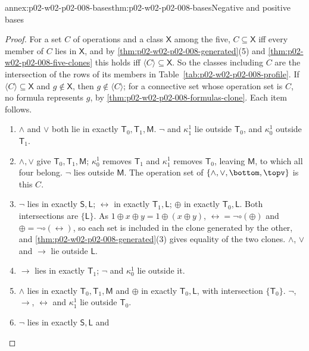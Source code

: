 \begin{annexitem}{annex:p02-w02-p02-008-bases}{thm:p02-w02-p02-008-bases}{Negative and positive bases}
\begin{proof}
For a set \(C\) of operations and a class \(\mathsf X\) among the five,
\(C\subseteq\mathsf X\) iff every member of \(C\) lies in \(\mathsf X\), and
by \cref{thm:p02-w02-p02-008-generated}(5) and
\cref{thm:p02-w02-p02-008-five-clones} this holds iff
\(\langle C\rangle\subseteq\mathsf X\).  So the classes including \(C\) are
the intersection of the rows of its members in
Table~\ref{tab:p02-w02-p02-008-profile}.  If \(\langle C\rangle\subseteq
\mathsf X\) and \(g\notin\mathsf X\), then \(g\notin\langle C\rangle\); for a
connective set whose operation set is \(C\), no formula represents \(g\), by
\cref{thm:p02-w02-p02-008-formulas-clone}.  Each item follows.
\begin{enumerate}
\item \(\land\) and \(\lor\) both lie in exactly
  \(\mathsf T_0,\mathsf T_1,\mathsf M\).  \(\neg\) and \(\kappa^1_1\) lie
  outside \(\mathsf T_0\), and \(\kappa^1_0\) outside \(\mathsf T_1\).
\item \(\land,\lor\) give \(\mathsf T_0,\mathsf T_1,\mathsf M\);
  \(\kappa^1_0\) removes \(\mathsf T_1\) and \(\kappa^1_1\) removes
  \(\mathsf T_0\), leaving \(\mathsf M\), to which all four belong.  \(\neg\)
  lies outside \(\mathsf M\).  The operation set of
  \(\{\land,\lor,\bottom,\topv\}\) is this \(C\).
\item \(\neg\) lies in exactly \(\mathsf S,\mathsf L\); \(\leftrightarrow\) in
  exactly \(\mathsf T_1,\mathsf L\); \(\oplus\) in exactly
  \(\mathsf T_0,\mathsf L\).  Both intersections are \(\{\mathsf L\}\).  As
  \(1\oplus x\oplus y=1\oplus(x\oplus y)\),
  \(\leftrightarrow=\neg\circ(\oplus)\) and \(\oplus=\neg\circ(\leftrightarrow)\),
  so each set is included in the clone generated by the other, and
  \cref{thm:p02-w02-p02-008-generated}(3) gives equality of the two clones.
  \(\land\), \(\lor\) and \(\to\) lie outside \(\mathsf L\).
\item \(\to\) lies in exactly \(\mathsf T_1\); \(\neg\) and \(\kappa^1_0\)
  lie outside it.
\item \(\land\) lies in exactly \(\mathsf T_0,\mathsf T_1,\mathsf M\) and
  \(\oplus\) in exactly \(\mathsf T_0,\mathsf L\), with intersection
  \(\{\mathsf T_0\}\).  \(\neg\), \(\to\), \(\leftrightarrow\) and
  \(\kappa^1_1\) lie outside \(\mathsf T_0\).
\item \(\neg\) lies in exactly \(\mathsf S,\mathsf L\) and

\end{enumerate}
\end{proof}
\end{annexitem}
